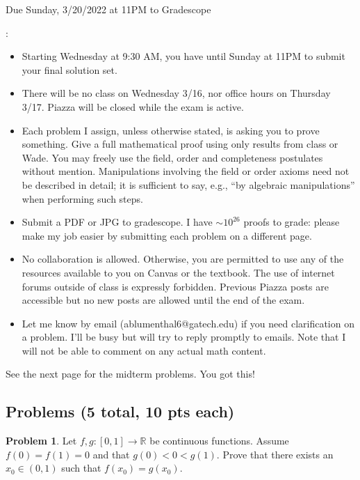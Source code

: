 \documentclass[11pt]{article}
\theoremstyle{definition}
\newtheorem{problem}{Problem}
\newcommand{\R}{\mathbb{R}}
\begin{document}
  \hfill Due Sunday, 3/20/2022 at 11PM to Gradescope

\bigskip

: 
\begin{itemize}
\item Starting Wednesday at 9:30 AM, you have until Sunday at 11PM to submit your final solution set. 
\item There will be no class on Wednesday 3/16, nor office hours on Thursday 3/17. Piazza will be closed while the exam is active. 
\item Each problem I assign, unless otherwise stated, is asking you to prove something. Give a full mathematical proof using only results from class or Wade. You may freely use the field, order and completeness postulates without mention. Manipulations involving the field or order axioms need not be described in detail; it is sufficient to say, e.g.,  ``by algebraic manipulations'' when performing such steps. 
\item Submit a PDF or JPG to gradescope. I have $\sim 10^{26}$ proofs to grade:  please make my job easier by submitting each problem on a different page. 
\item No collaboration is allowed. Otherwise, you are permitted to use any of the resources available to you on Canvas or the textbook. The use of internet forums outside of class is expressly forbidden. Previous Piazza posts are accessible but no new posts are allowed until the end of the exam. 
\item Let me know by email (ablumenthal6@gatech.edu) if you need clarification on a problem. I'll be busy but will try to reply promptly to emails. Note that I will not be able to comment on any actual math content. 
\end{itemize}

See the next page for the midterm problems. You got this!

\newpage

\subsection*{Problems (5 total, 10 pts each)}

\begin{problem}
Let $f, g : [0,1] \to \R$ be continuous functions. Assume $f(0) = f(1) = 0$ and 
that $g(0) < 0 < g(1)$. Prove that there exists an $x_0 \in (0,1)$ such that $f(x_0) = g(x_0)$. 
\end{problem}
\end{document}
